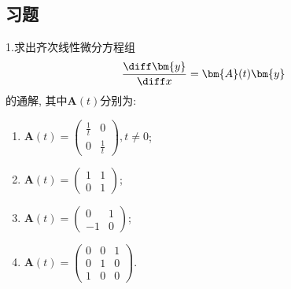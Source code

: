 \subsection{习题}


1.求出齐次线性微分方程组\[\frac{\diff\bm{y}}{\diff x}=\bm{A}(t)\bm{y}\]
的通解, 其中$\bm{A}(t)$分别为:
\begin{enumerate}[(1)]
\item $\displaystyle\bm{A}(t)=\begin{pmatrix}\frac{1}{t}&0\\0&\frac{1}{t}\end{pmatrix},t\neq0$;
\item $\displaystyle\bm{A}(t)=\begin{pmatrix}1&1\\0&1\end{pmatrix}$;
\item $\displaystyle\bm{A}(t)=\begin{pmatrix}0&1\\-1&0\end{pmatrix}$;
\item $\displaystyle\bm{A}(t)=\begin{pmatrix}0&0&1\\0&1&0\\1&0&0\end{pmatrix}$.
\end{enumerate}

